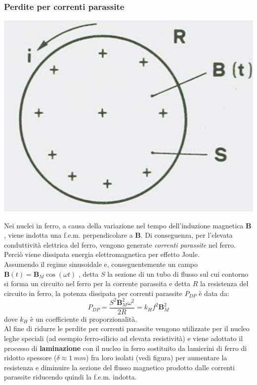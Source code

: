 \documentclass{article}
\begin{document}
\subsubsection*{Perdite per correnti parassite}
\begin{center}
    \includegraphics[scale=0.24]{Image/Nucleo_ferro.png}
\end{center}
Nei nuclei in ferro, a causa della variazione nel
tempo dell'induzione magnetica $\mathbf{B}$, viene indotta una f.e.m. perpendicolare a $\mathbf{B}$. Di  conseguenza, per l'elevata conduttività elettrica del ferro, vengono generate \textit{correnti parassite} nel ferro. Perciò viene dissipata energia elettromagnetica per effetto Joule.\\
Assumendo il regime sinusoidale e, conseguentemente un campo $\mathbf{B}(t) = \mathbf{B}_M \cos (\omega t)$ , detta $S$ la sezione di un tubo di flusso sul cui contorno si forma un circuito nel ferro per la corrente parassita e detta $R$ la resistenza del circuito in ferro, la potenza dissipata per correnti parassite $P_{DP}$ è data da:
\[
    P_{DP} =\frac{S^2\mathbf{B}_M^2 \omega^2}{2R} = k_H f^2 \mathbf{B}_M^2
\]
dove $k_H$ è un coefficiente di proporzionalità.\\
Al fine di ridurre le perdite per correnti parassite vengono utilizzate per il nucleo leghe speciali (ad esempio ferro-silicio ad elevata resistività) e viene adottato il processo di
\textbf{laminazione} con il nucleo in ferro sostituito da lamierini di ferro di ridotto spessore ($\delta \approx 1 \ mm$) fra loro isolati (vedi figura) per aumentare la resistenza e diminuire la sezione del flusso magnetico prodotto dalle correnti parassite riducendo quindi la f.e.m. indotta.
\end{document}
